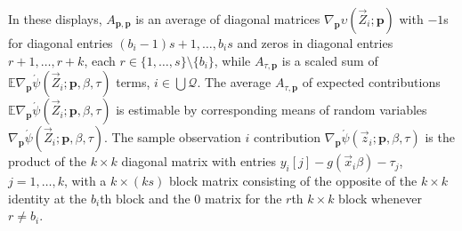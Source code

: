 \documentclass{article}
\newcommand{\absorbInterceptsEF}{\upsilon}
\begin{document}
In these displays, $A_{\mathbf{p}, \mathbf{p}}$ is
an average of diagonal matrices $\nabla_{\mathbf{p}}\absorbInterceptsEF(\vec{Z}_{i};
\mathbf{p})$ with $-1$s for diagonal entries $(b_{i}-1)s+1, \ldots,
b_{i}s$ and zeros in diagonal entries $r+1, \ldots, r+k$, each
$r \in \{1, \ldots, s\}\setminus \{b_{i}\}$, while $A_{\tau,
  \mathbf{p}}$ is a scaled sum of $\mathbb{E} \nabla_{\mathbf{p}}\acute{\psi}(\vec{Z}_{i};
\mathbf{p}, \beta, \tau)$ terms, $i \in \bigcup \mathcal{Q}$. The average $A_{\tau,
  \mathbf{p}}$ of expected contributions $\mathbb{E} \nabla_{\mathbf{p}}\acute{\psi}(\vec{Z}_{i};
\mathbf{p}, \beta, \tau)$ is estimable by corresponding means of
random variables $\nabla_{\mathbf{p}}\acute{\psi}(\vec{Z}_{i};
\mathbf{p}, \beta, \tau)$.  The sample observation $i$ contribution $\nabla_{\mathbf{p}}\acute{\psi}(\vec{z}_{i};
\mathbf{p}, \beta, \tau)$ is the product of the $k \times k$
diagonal matrix with entries $y_{i}[j] - g(\vec{x}_{i}\beta) -
\tau_{j}$, $j=1, \ldots, k$, with a $k \times (ks)$ block matrix
consisting of the opposite of the $k\times k$ identity at the
$b_{i}$th block and the 0 matrix for the $r$th $k \times k$ block whenever
$r\neq b_{i}$.
\end{document}

